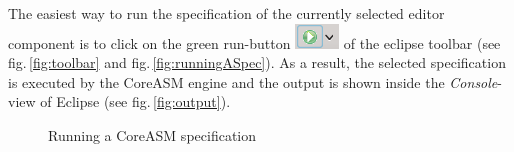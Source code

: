 \documentclass[10pt,oneside,a4paper]{article}
\begin{document}
The easiest way to run the specification of the currently selected editor component is to click on the green run-button \includegraphics[height=.8em]{images/run-button.png} of the eclipse toolbar (see fig.\,\ref{fig:toolbar} and fig.\,\ref{fig:runningASpec}). As a result, the selected specification is executed by the CoreASM engine and the output is shown inside the \emph{Console}-view of Eclipse (see fig.\,\ref{fig:output}).
\begin{figure}[h]
\centering

\quad
 \quad

   \quad\hspace{0.8cm}
\caption{Running a CoreASM specification}
\label{fig:run}
\end{figure}
\end{document}
